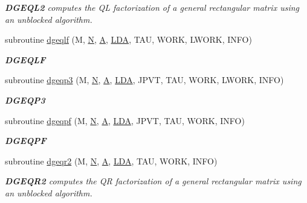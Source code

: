 \begin{DoxyCompactItemize}
\begin{DoxyCompactList}\small\item\em {\bfseries D\+G\+E\+Q\+L2} computes the Q\+L factorization of a general rectangular matrix using an unblocked algorithm. \end{DoxyCompactList}\item 
subroutine \hyperlink{group__doubleGEcomputational_ga0860daeae9b6084202a647418f54af27}{dgeqlf} (M, \hyperlink{polmisc_8c_a0240ac851181b84ac374872dc5434ee4}{N}, \hyperlink{classA}{A}, \hyperlink{example__user_8c_ae946da542ce0db94dced19b2ecefd1aa}{L\+D\+A}, T\+A\+U, W\+O\+R\+K, L\+W\+O\+R\+K, I\+N\+F\+O)
\begin{DoxyCompactList}\small\item\em {\bfseries D\+G\+E\+Q\+L\+F} \end{DoxyCompactList}\item 
subroutine \hyperlink{group__doubleGEcomputational_ga1b0500f49e03d2771b797c6e88adabbb}{dgeqp3} (M, \hyperlink{polmisc_8c_a0240ac851181b84ac374872dc5434ee4}{N}, \hyperlink{classA}{A}, \hyperlink{example__user_8c_ae946da542ce0db94dced19b2ecefd1aa}{L\+D\+A}, J\+P\+V\+T, T\+A\+U, W\+O\+R\+K, L\+W\+O\+R\+K, I\+N\+F\+O)
\begin{DoxyCompactList}\small\item\em {\bfseries D\+G\+E\+Q\+P3} \end{DoxyCompactList}\item 
subroutine \hyperlink{group__doubleGEcomputational_gaecad6eac294d2df861c6ae3b614c1ce8}{dgeqpf} (M, \hyperlink{polmisc_8c_a0240ac851181b84ac374872dc5434ee4}{N}, \hyperlink{classA}{A}, \hyperlink{example__user_8c_ae946da542ce0db94dced19b2ecefd1aa}{L\+D\+A}, J\+P\+V\+T, T\+A\+U, W\+O\+R\+K, I\+N\+F\+O)
\begin{DoxyCompactList}\small\item\em {\bfseries D\+G\+E\+Q\+P\+F} \end{DoxyCompactList}\item 
subroutine \hyperlink{group__doubleGEcomputational_ga86586a8c4f1c31707724ed70e92f6f34}{dgeqr2} (M, \hyperlink{polmisc_8c_a0240ac851181b84ac374872dc5434ee4}{N}, \hyperlink{classA}{A}, \hyperlink{example__user_8c_ae946da542ce0db94dced19b2ecefd1aa}{L\+D\+A}, T\+A\+U, W\+O\+R\+K, I\+N\+F\+O)
\begin{DoxyCompactList}\small\item\em {\bfseries D\+G\+E\+Q\+R2} computes the Q\+R factorization of a general rectangular matrix using an unblocked algorithm. \end{DoxyCompactList}\item 

\end{DoxyCompactItemize}

